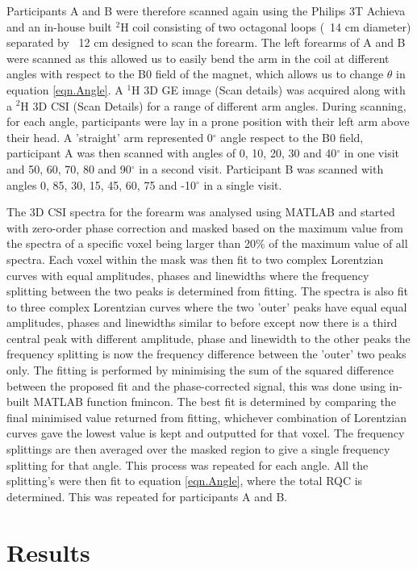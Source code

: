 \documentclass[class=article, crop=false]{standalone}
\begin{document}
Participants A and B were therefore scanned again using the Philips 3T Achieva and an in-house built $^2$H coil consisting of two octagonal loops (~14 cm diameter) separated by ~12 cm designed to scan the forearm. The left forearms of A and B were scanned as this allowed us to easily bend the arm in the coil at different angles with respect to the B0 field of the magnet, which allows us to change $\theta$ in equation \ref{eqn.Angle}. A $^1$H 3D GE image (Scan details) was acquired along with a $^2$H 3D CSI (Scan Details) for a range of different arm angles. During scanning, for each angle, participants were lay in a prone position with their left arm above their head. A 'straight' arm represented  0$^{\circ}$ angle respect to the B0 field, participant A was then scanned with angles of 0, 10, 20, 30 and 40$^{\circ}$ in one visit and 50, 60, 70, 80 and 90$^{\circ}$ in a second visit. Participant B was scanned with angles 0, 85, 30, 15, 45, 60, 75 and -10$^{\circ}$ in a single visit. 

The 3D CSI spectra for the forearm was analysed using MATLAB and started with zero-order phase correction and masked based on the maximum value from the spectra of a specific voxel being larger than 20\% of the maximum value of all spectra. Each voxel within the mask was then fit to two complex Lorentzian curves with equal amplitudes, phases and linewidths where the frequency splitting between the two peaks is determined from fitting. The spectra is also fit to three complex Lorentzian curves where the two 'outer' peaks have equal equal amplitudes, phases and linewidths similar to before except now there is a third central peak with different amplitude, phase and linewidth to the other peaks the frequency splitting is now the frequency difference between the 'outer' two peaks only. The fitting is performed by minimising the sum of the squared difference between the proposed fit and the phase-corrected signal, this was done using in-built MATLAB function fmincon. The best fit is determined by comparing the final minimised value returned from fitting, whichever combination of Lorentzian curves gave the lowest value is kept and outputted for that voxel. The frequency splittings are then averaged over the masked region to give a single frequency splitting for that angle. This process was repeated for each angle. All the splitting's were then fit to equation \ref{eqn.Angle}, where the total RQC is determined. This was repeated for participants A and B.

\section{Results}
\end{document}

